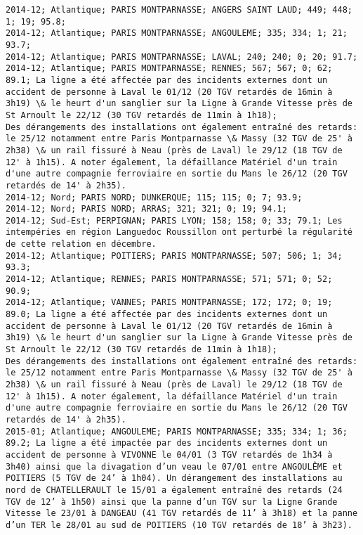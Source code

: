 \documentclass{article}
\begin{document}
\begin{Verbatim}[commandchars=\\\{\}]
2014-12; Atlantique; PARIS MONTPARNASSE; ANGERS SAINT LAUD; 449; 448; 1; 19; 95.8; 
2014-12; Atlantique; PARIS MONTPARNASSE; ANGOULEME; 335; 334; 1; 21; 93.7; 
2014-12; Atlantique; PARIS MONTPARNASSE; LAVAL; 240; 240; 0; 20; 91.7; 
2014-12; Atlantique; PARIS MONTPARNASSE; RENNES; 567; 567; 0; 62; 89.1; La ligne a été affectée par des incidents externes dont un accident de personne à Laval le 01/12 (20 TGV retardés de 16min à 3h19) \& le heurt d'un sanglier sur la Ligne à Grande Vitesse près de St Arnoult le 22/12 (30 TGV retardés de 11min à 1h18);
Des dérangements des installations ont également entraîné des retards: le 25/12 notamment entre Paris Montparnasse \& Massy (32 TGV de 25' à 2h38) \& un rail fissuré à Neau (près de Laval) le 29/12 (18 TGV de 12' à 1h15). A noter également, la défaillance Matériel d'un train d'une autre compagnie ferroviaire en sortie du Mans le 26/12 (20 TGV retardés de 14' à 2h35). 
2014-12; Nord; PARIS NORD; DUNKERQUE; 115; 115; 0; 7; 93.9; 
2014-12; Nord; PARIS NORD; ARRAS; 321; 321; 0; 19; 94.1; 
2014-12; Sud-Est; PERPIGNAN; PARIS LYON; 158; 158; 0; 33; 79.1; Les intempéries en région Languedoc Roussillon ont perturbé la régularité de cette relation en décembre.
2014-12; Atlantique; POITIERS; PARIS MONTPARNASSE; 507; 506; 1; 34; 93.3; 
2014-12; Atlantique; RENNES; PARIS MONTPARNASSE; 571; 571; 0; 52; 90.9; 
2014-12; Atlantique; VANNES; PARIS MONTPARNASSE; 172; 172; 0; 19; 89.0; La ligne a été affectée par des incidents externes dont un accident de personne à Laval le 01/12 (20 TGV retardés de 16min à 3h19) \& le heurt d'un sanglier sur la Ligne à Grande Vitesse près de St Arnoult le 22/12 (30 TGV retardés de 11min à 1h18);
Des dérangements des installations ont également entraîné des retards: le 25/12 notamment entre Paris Montparnasse \& Massy (32 TGV de 25' à 2h38) \& un rail fissuré à Neau (près de Laval) le 29/12 (18 TGV de 12' à 1h15). A noter également, la défaillance Matériel d'un train d'une autre compagnie ferroviaire en sortie du Mans le 26/12 (20 TGV retardés de 14' à 2h35).
2015-01; Atlantique; ANGOULEME; PARIS MONTPARNASSE; 335; 334; 1; 36; 89.2; La ligne a été impactée par des incidents externes dont un accident de personne à VIVONNE le 04/01 (3 TGV retardés de 1h34 à 3h40) ainsi que la divagation d’un veau le 07/01 entre ANGOULÊME et POITIERS (5 TGV de 24’ à 1h04). Un dérangement des installations au nord de CHATELLERAULT le 15/01 a également entraîné des retards (24 TGV de 12’ à 1h50) ainsi que la panne d’un TGV sur la Ligne Grande Vitesse le 23/01 à DANGEAU (41 TGV retardés de 11’ à 3h18) et la panne d’un TER le 28/01 au sud de POITIERS (10 TGV retardés de 18’ à 3h23).

\end{Verbatim}
\end{document}
